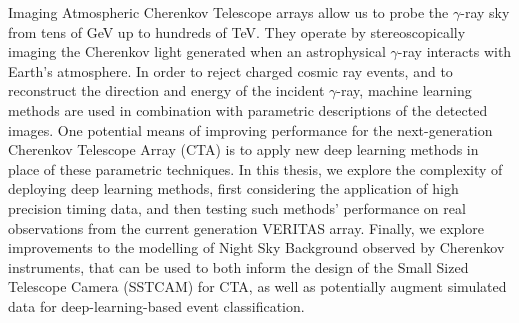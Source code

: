 Imaging Atmospheric Cherenkov Telescope arrays allow us to probe the $\gamma$-ray sky from tens of GeV up to hundreds of TeV. They operate by stereoscopically imaging the Cherenkov light generated when an astrophysical $\gamma$-ray interacts with Earth's atmosphere. In order to reject charged cosmic ray events, and to reconstruct the direction and energy of the incident $\gamma$-ray, machine learning methods are used in combination with parametric descriptions of the detected images. One potential means of improving performance for the next-generation Cherenkov Telescope Array (CTA) is to apply new deep learning methods in place of these parametric techniques. In this thesis, we explore the complexity of deploying deep learning methods, first considering the application of high precision timing data, and then testing such methods' performance on real observations from the current generation VERITAS array. Finally, we explore improvements to the modelling of Night Sky Background observed by Cherenkov instruments, that can be used to both inform the design of the Small Sized Telescope Camera (SSTCAM) for CTA, as well as potentially augment simulated data for deep-learning-based event classification.